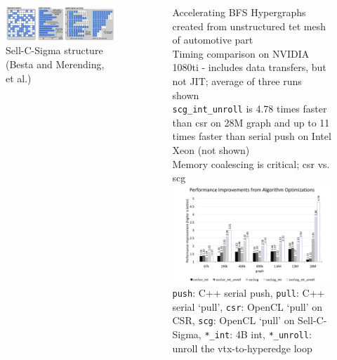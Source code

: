 \documentclass[final]{beamer}
\newlength{\sepwid}
\newlength{\onecolwid}
\begin{document}
\begin{frame}[t]
\begin{columns}[t]
\begin{column}{\onecolwid}
\begin{figure}
  \centering
  \includegraphics[width=.9\textwidth]{../accelerated_cse19/figures/sellcsigma.png}\\
  Sell-C-Sigma structure (Besta and Merending, et al.)
\end{figure}


\end{column} %
\begin{column}{\sepwid}\end{column} %
\begin{column}{\onecolwid} %

\begin{block}{Accelerating BFS}
  Hypergraphs created from unstructured tet mesh of automotive part \\
  Timing comparison on NVIDIA 1080ti - includes data transfers, but not JIT; 
  average of three runs shown \\
  \texttt{scg\_int\_unroll} is 4.78 times faster than csr on 28M graph and up to 
      11 times faster than serial push on Intel Xeon (not shown) \\
  Memory coalescing is critical; csr vs. scg \\
  {
    \centering
    \includegraphics[width=.97\textwidth]{../accelerated_cse19/results/openclBfs.png} \\
    { \small
    \texttt{push}: C++ serial push,
    \texttt{pull}: C++ serial `pull',
    \texttt{csr}: OpenCL `pull' on CSR, 
    \texttt{scg}: OpenCL `pull' on Sell-C-Sigma,
    \texttt{*\_int}: 4B int,
    \texttt{*\_unroll}: unroll the vtx-to-hyperedge loop
    }
  }
\end{block}


\end{column}
\end{columns}
\end{frame}
\end{document}
